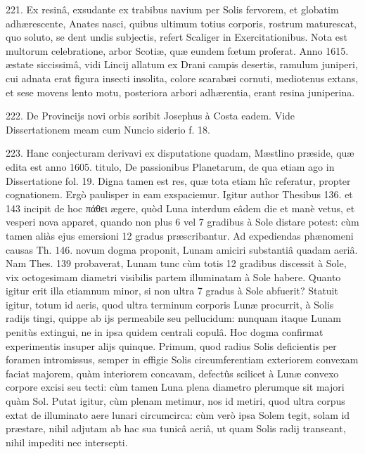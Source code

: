 \documentclass[a4paper, 11pt, oneside, polutonikogreek, german]{article}
\begin{document}
221. Ex resinâ, exsudante ex trabibus navium per Solis fervorem, et globatim adhærescente, Anates nasci, quibus ultimum totius corporis, rostrum maturescat, quo soluto, se dent undis subjectis, refert Scaliger in Exercitationibus. Nota est multorum celebratione, arbor Scotiæ, quæ eundem fœtum proferat. Anno 1615. æstate siccissimâ, vidi Lincij allatum ex Drani campis desertis, ramulum juniperi, cui adnata erat figura insecti insolita, colore scarabæi cornuti, mediotenus extans, et sese movens lento motu, posteriora arbori adhærentia, erant resina juniperina.

222. De Provincijs novi orbis soribit Josephus à Costa eadem. Vide Dissertationem meam cum Nuncio siderio f. 18.

223. Hanc conjecturam derivavi ex disputatione quadam, Mæstlino præside, quæ edita est anno 1605. titulo, De passionibus Planetarum, de qua etiam ago in Dissertatione fol. 19. Digna tamen est res, quæ tota etiam hîc referatur, propter cognationem. Ergò paulisper in eam exspaciemur.\hspace*{5mm}
Igitur author Thesibus 136. et 143 incipit de hoc πάθει ægere, quòd Luna interdum eâdem die et manè vetus, et vesperi nova apparet, quando non plus 6 vel 7 gradibus à Sole distare potest: cùm tamen aliàs ejus emersioni 12 gradus præscribantur. Ad expediendas phænomeni causas Th. 146. novum dogma proponit, Lunam amiciri substantiâ quadam aeriâ. Nam Thes. 139 probaverat, Lunam tunc cùm totis 12 gradibus discessit à Sole, vix octogesimam diametri visibilis partem illuminatam à Sole habere. Quanto igitur erit illa etiamnum minor, si non ultra 7 gradus à Sole abfuerit? Statuit igitur, totum id aeris, quod ultra terminum corporis Lunæ procurrit, à Solis radijs tingi, quippe ab ijs permeabile seu pellucidum: nunquam itaque Lunam penitùs extingui, ne in ipsa quidem centrali copulâ.\hspace*{5mm}
Hoc dogma confirmat experimentis insuper alijs quinque. Primum, quod radius Solis deficientis per foramen intromissus, semper in effigie Solis circumferentiam exteriorem convexam faciat majorem, quàm interiorem concavam, defectûs scilicet à Lunæ convexo corpore excisi seu tecti: cùm tamen Luna plena diametro plerumque sit majori quàm Sol. Putat igitur, cùm plenam metimur, nos id metiri, quod ultra corpus extat de illuminato aere lunari circumcirca: cùm verò ipsa Solem tegit, solam id præstare, nihil adjutam ab hac sua tunicâ aeriâ, ut quam Solis radij transeant, nihil impediti nec intersepti.\hspace*{5mm}
\end{document}
